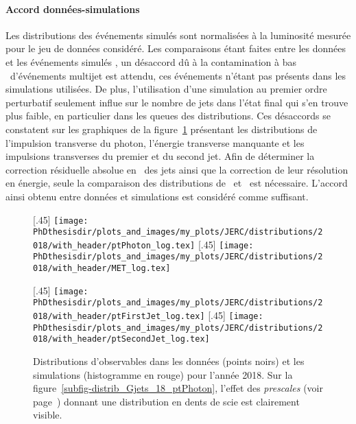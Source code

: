 \paragraph{Accord données-simulations}
Les distributions des événements simulés sont normalisées à la luminosité mesurée pour le jeu de données considéré.
Les comparaisons étant faites entre les données et les événements simulés \Gjets, un désaccord dû à la contamination à bas \pT\ d'événements multijet est attendu, ces événements n'étant pas présents dans les simulations utilisées.
De plus, l'utilisation d'une simulation au premier ordre perturbatif seulement influe sur le nombre de jets dans l'état final qui s'en trouve plus faible, en particulier dans les queues des distributions.
Ces désaccords se constatent sur les graphiques de la figure~\ref{fig-distribs_Gjets_18} présentant les distributions de l'impulsion transverse du photon, l'énergie transverse manquante et les impulsions transverses du premier et du second jet.
Afin de déterminer la correction résiduelle absolue en \pT\ des jets ainsi que la correction de leur résolution en énergie, seule la comparaison des distributions de \Rbal\ et \RMPF\ est nécessaire.
L'accord ainsi obtenu entre données et simulations est considéré comme suffisant.
\begin{figure}[h]
\centering
{}[.45\textwidth]
{\texttt{[image: \\PhDthesisdir/plots\_and\_images/my\_plots/JERC/distributions/2018/with\_header/ptPhoton\_log.tex]}}
\hfill
{}[.45\textwidth]
{\texttt{[image: \\PhDthesisdir/plots\_and\_images/my\_plots/JERC/distributions/2018/with\_header/MET\_log.tex]}}

\vspace{\baselineskip}

[.45\textwidth]
{\texttt{[image: \\PhDthesisdir/plots\_and\_images/my\_plots/JERC/distributions/2018/with\_header/ptFirstJet\_log.tex]}}
\hfill
{}[.45\textwidth]
{\texttt{[image: \\PhDthesisdir/plots\_and\_images/my\_plots/JERC/distributions/2018/with\_header/ptSecondJet\_log.tex]}}

\caption[Observables d'événements \Gjets\ en 2018.]{Distributions d'observables dans les données (points noirs) et les simulations (histogramme en rouge) pour l'année 2018. Sur la figure~\ref{subfig-distrib_Gjets_18_ptPhoton}, l'effet des \emph{prescales} (voir page~\pageref{tab-HLT_pT_precales_18_and_17UL}) donnant une distribution en dents de scie est clairement visible.}
\label{fig-distribs_Gjets_18}
\end{figure}
